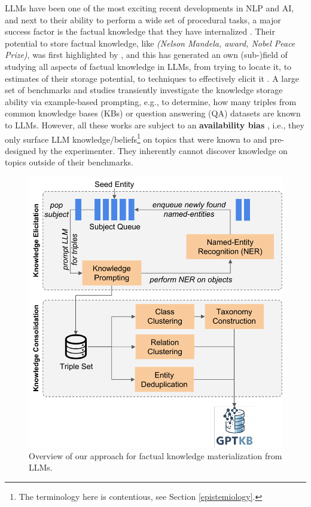 LLMs have been one of the most exciting recent developments in NLP and AI, and next to their ability to perform a wide set of procedural tasks, a major success factor is the factual knowledge that they have internalized \cite{bubeck2023sparks}. Their potential to store factual knowledge, like \textit{(Nelson Mandela, award, Nobel Peace Prize)}, was first highlighted by \citet{petroni-etal-2019-language}, and this has generated an own (sub-)field of studying all aspects of factual knowledge in LLMs, from trying to locate it, to estimates of their storage potential, to techniques to effectively elicit it \cite{jiang-etal-2020-know,roberts-etal-2020-much,veseli2023evaluating,sun-etal-2024-head,wu2024towards}. A large set of benchmarks and studies transiently investigate the knowledge storage ability via example-based prompting, e.g., to determine, how many triples from common knowledge bases (KBs) or question answering (QA) datasets are known to LLMs. However, all these works are subject to an \textbf{availability bias} \cite{kahnemann}, i.e., they only surface LLM knowledge/beliefs\footnote{The terminology here is contentious, see Section \ref{epistemiology}.} on topics that were known to and pre-designed by the experimenter. They inherently cannot discover knowledge on topics outside of their benchmarks.

\begin{figure}[t]
 \centering
  \includegraphics[width=\columnwidth,]{figures/gptkb-pipeline.pdf}
 \caption{Overview of our approach for factual knowledge materialization from LLMs.
 }
 \label{fig:overview}
 \end{figure}

